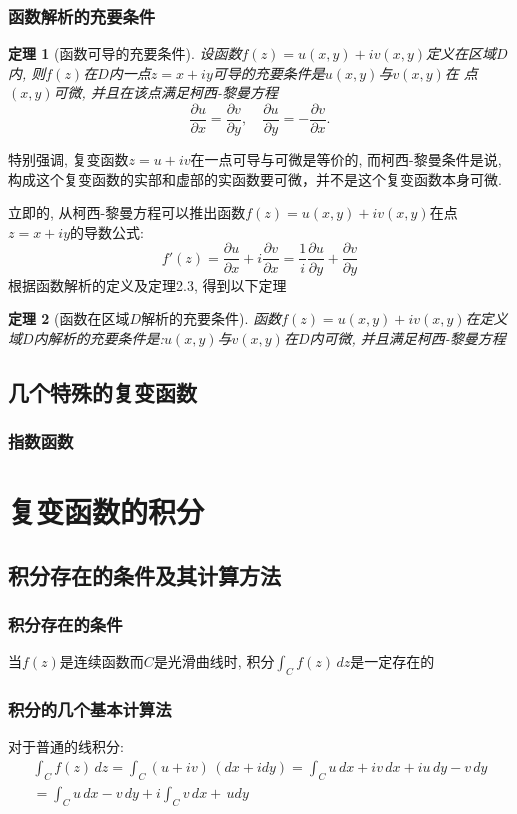 \documentclass[12pt, a4paper, oneside]{ctexart}
\theoremstyle{plain}
\newtheorem{theorem}{定理}[section]
\theoremstyle{definition}
\theoremstyle{definition}
\begin{document}
\subsubsection{函数解析的充要条件}
\begin{theorem}[函数可导的充要条件]
设函数$f(z)=u(x,y)+iv(x,y)$定义在区域$D$内, 则$f(z)$在$D$内一点$z=x+iy$可导的充要条件是$u(x,y)$与$v(x,y)$在
点$(x,y)$可微, 并且在该点满足柯西-黎曼方程
\[
    \frac{\partial u}{\partial x}=\frac{\partial v}{\partial y}, \quad\frac{\partial u}{\partial y}=
    -\frac{\partial v}{\partial x}.
\]
\end{theorem}
特别强调, 复变函数$z=u+iv$在一点可导与可微是等价的, 而柯西-黎曼条件是说, 构成这个复变函数的实部和虚部的实函数要可微，并不是这个复变函数本身可微.

立即的, 从柯西-黎曼方程可以推出函数$f(z)=u(x,y)+iv(x,y)$在点$z=x+iy$的导数公式:
\[
    f'(z)=\frac{\partial u}{\partial x}+i\frac{\partial v}{\partial x}=
    \frac{1}{i}\frac{\partial u}{\partial y}+\frac{\partial v}{\partial y}
\]
根据函数解析的定义及定理2.3, 得到以下定理
\begin{theorem}[函数在区域$D$解析的充要条件]
    函数$f(z)=u(x,y)+iv(x,y)$在定义域$D$内解析的充要条件是:$u(x,y)$与$v(x,y)$在$D$内可微, 并且满足柯西-黎曼方程
\end{theorem}
\subsection{几个特殊的复变函数}
\subsubsection{指数函数}
\section{复变函数的积分}
\subsection{积分存在的条件及其计算方法}
\subsubsection{积分存在的条件}
当$f(z)$是连续函数而$C$是光滑曲线时, 积分$\int_{C}f(z)  \,dz $是一定存在的
\subsubsection{积分的几个基本计算法}
对于普通的线积分:
\begin{align*}
    \int_{C}f(z)\,dz=\int_{C}(u+iv)\,(dx+idy)=\int_{C}u\,dx+iv\,dx+iu\,dy-v\,dy \\
    =\int_{C}u\,dx-v\,dy+i\int_{C}v\,dx+\,udy
\end{align*}
\end{document}

